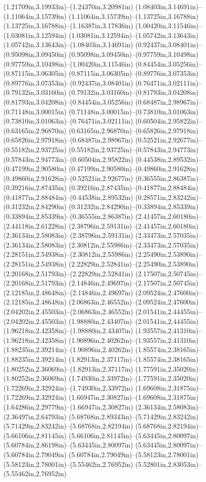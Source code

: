 (1.21709in,3.19933in)--(1.24370in,3.20981in) (1.08403in,3.14691in)--(1.11064in,3.15739in) (1.11064in,3.15739in)--(1.13725in,3.16788in) (1.13725in,3.16788in)--(1.16387in,3.17836in) (1.00420in,3.11546in)--(1.03081in,3.12594in) (1.03081in,3.12594in)--(1.05742in,3.13643in) (1.05742in,3.13643in)--(1.08403in,3.14691in) (0.92437in,3.08401in)--(0.95098in,3.09450in) (0.95098in,3.09450in)--(0.97759in,3.10498in) (0.97759in,3.10498in)--(1.00420in,3.11546in) (0.84454in,3.05256in)--(0.87115in,3.06305in) (0.87115in,3.06305in)--(0.89776in,3.07353in) (0.89776in,3.07353in)--(0.92437in,3.08401in) (0.76471in,3.02111in)--(0.79132in,3.03160in) (0.79132in,3.03160in)--(0.81793in,3.04208in) (0.81793in,3.04208in)--(0.84454in,3.05256in) (0.68487in,2.98967in)--(0.71148in,3.00015in) (0.71148in,3.00015in)--(0.73810in,3.01063in) (0.73810in,3.01063in)--(0.76471in,3.02111in) (0.60504in,2.95822in)--(0.63165in,2.96870in) (0.63165in,2.96870in)--(0.65826in,2.97918in) (0.65826in,2.97918in)--(0.68487in,2.98967in) (0.52521in,2.92677in)--(0.55182in,2.93725in) (0.55182in,2.93725in)--(0.57843in,2.94773in) (0.57843in,2.94773in)--(0.60504in,2.95822in) (0.44538in,2.89532in)--(0.47199in,2.90580in) (0.47199in,2.90580in)--(0.49860in,2.91628in) (0.49860in,2.91628in)--(0.52521in,2.92677in) (0.36555in,2.86387in)--(0.39216in,2.87435in) (0.39216in,2.87435in)--(0.41877in,2.88484in) (0.41877in,2.88484in)--(0.44538in,2.89532in) (0.28571in,2.83242in)--(0.31232in,2.84290in) (0.31232in,2.84290in)--(0.33894in,2.85339in) (0.33894in,2.85339in)--(0.36555in,2.86387in) (2.41457in,2.60180in)--(2.44118in,2.61228in) (2.38796in,2.59131in)--(2.41457in,2.60180in) (2.36134in,2.58083in)--(2.38796in,2.59131in) (2.33473in,2.57035in)--(2.36134in,2.58083in) (2.30812in,2.55986in)--(2.33473in,2.57035in) (2.28151in,2.54938in)--(2.30812in,2.55986in) (2.25490in,2.53890in)--(2.28151in,2.54938in) (2.22829in,2.52841in)--(2.25490in,2.53890in) (2.20168in,2.51793in)--(2.22829in,2.52841in) (2.17507in,2.50745in)--(2.20168in,2.51793in) (2.14846in,2.49697in)--(2.17507in,2.50745in) (2.12185in,2.48648in)--(2.14846in,2.49697in) (2.09524in,2.47600in)--(2.12185in,2.48648in) (2.06863in,2.46552in)--(2.09524in,2.47600in) (2.04202in,2.45503in)--(2.06863in,2.46552in) (2.01541in,2.44455in)--(2.04202in,2.45503in) (1.98880in,2.43407in)--(2.01541in,2.44455in) (1.96218in,2.42358in)--(1.98880in,2.43407in) (1.93557in,2.41310in)--(1.96218in,2.42358in) (1.90896in,2.40262in)--(1.93557in,2.41310in) (1.88235in,2.39214in)--(1.90896in,2.40262in) (1.85574in,2.38165in)--(1.88235in,2.39214in) (1.82913in,2.37117in)--(1.85574in,2.38165in) (1.80252in,2.36069in)--(1.82913in,2.37117in) (1.77591in,2.35020in)--(1.80252in,2.36069in) (1.74930in,2.33972in)--(1.77591in,2.35020in) (1.72269in,2.32924in)--(1.74930in,2.33972in) (1.69608in,2.31875in)--(1.72269in,2.32924in) (1.66947in,2.30827in)--(1.69608in,2.31875in) (1.64286in,2.29779in)--(1.66947in,2.30827in) (2.36134in,2.58083in)--(2.36497in,2.64793in) (5.68768in,2.89343in)--(5.71429in,2.83242in) (5.71429in,2.83242in)--(5.68768in,2.82194in) (5.68768in,2.82194in)--(5.66106in,2.81145in) (5.66106in,2.81145in)--(5.63445in,2.80097in) (5.60784in,2.86198in)--(5.63445in,2.80097in) (5.63445in,2.80097in)--(5.60784in,2.79049in) (5.60784in,2.79049in)--(5.58123in,2.78001in) (5.58123in,2.78001in)--(5.55462in,2.76952in) (5.52801in,2.83053in)--(5.55462in,2.76952in) 